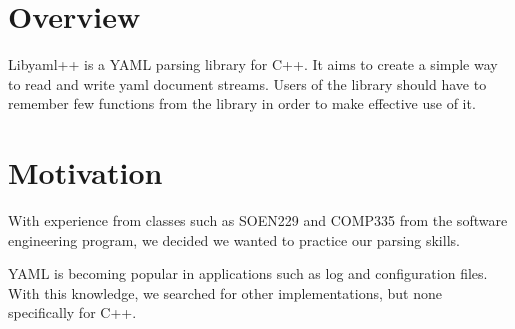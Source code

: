 \documentclass{article}
\begin{document}
\section{Overview}
Libyaml++ is a YAML parsing library for C++. It aims to create a simple way to
read and write yaml document streams. Users of the library should have to
remember few functions from the library in order to make effective use of it.

\section{Motivation}
With experience from classes such as SOEN229 and COMP335 from the software
engineering program, we decided we wanted to practice our parsing skills.

YAML is becoming popular in applications such as log and configuration files.
With this knowledge, we searched for other implementations, but none
specifically for C++.


%
%

%
%
\end{document}
